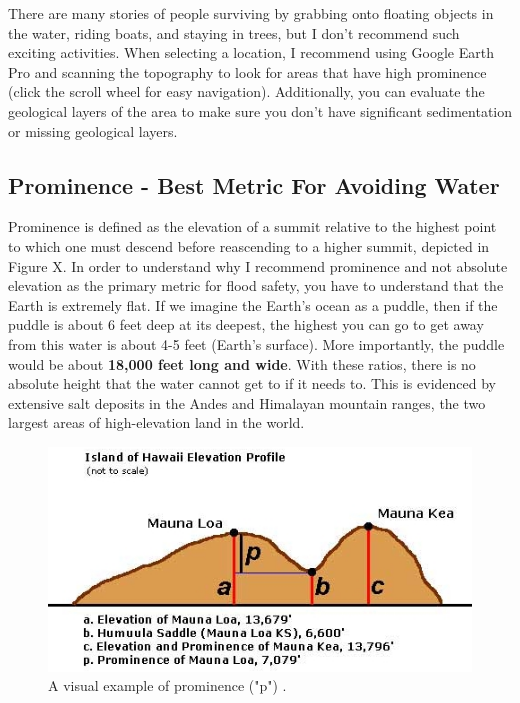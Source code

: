 \documentclass[10pt,twocolumn,letterpaper]{article}
\begin{document}
There are many stories of people surviving by grabbing onto floating objects in the water, riding boats, and staying in trees, but I don't recommend such exciting activities. When selecting a location, I recommend using Google Earth Pro and scanning the topography to look for areas that have high prominence (click the scroll wheel for easy navigation). Additionally, you can evaluate the geological layers of the area to make sure you don't have significant sedimentation or missing geological layers.

\subsection{Prominence - Best Metric For Avoiding Water}

Prominence is defined as the elevation of a summit relative to the highest point to which one must descend before reascending to a higher summit, depicted in Figure X. In order to understand why I recommend prominence and not absolute elevation as the primary metric for flood safety, you have to understand that the Earth is extremely flat. If we imagine the Earth's ocean as a puddle, then if the puddle is about 6 feet deep at its deepest, the highest you can go to get away from this water is about 4-5 feet (Earth's surface). More importantly, the puddle would be about \textbf{18,000 feet long and wide}. With these ratios, there is no absolute height that the water cannot get to if it needs to. This is evidenced by extensive salt deposits in the Andes and Himalayan mountain ranges, the two largest areas of high-elevation land in the world.

\begin{figure}[t]
\begin{center}
   \includegraphics[width=1\linewidth]{prominence.jpeg}
\end{center}
   \caption{A visual example of prominence ("p") \cite{53}.}
\label{fig:11}
\label{fig:onecol}
\end{figure}
\end{document}
